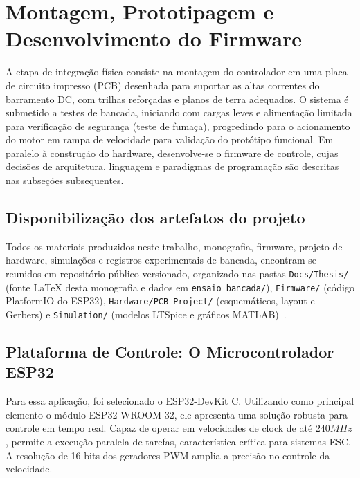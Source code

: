\section{Montagem, Prototipagem e Desenvolvimento do Firmware}
A etapa de integração física consiste na montagem do controlador em uma placa de circuito impresso (PCB) desenhada para suportar as altas correntes do barramento DC, com trilhas reforçadas e planos de terra adequados. O sistema é submetido a testes de bancada, iniciando com cargas leves e alimentação limitada para verificação de segurança (teste de fumaça), progredindo para o acionamento do motor em rampa de velocidade para validação do protótipo funcional. Em paralelo à construção do hardware, desenvolve-se o firmware de controle, cujas decisões de arquitetura, linguagem e paradigmas de programação são descritas nas subseções subsequentes.

\subsection{Disponibilização dos artefatos do projeto}
\label{subsec:repositorio_projeto}
Todos os materiais produzidos neste trabalho, monografia, firmware, projeto de hardware, simulações e registros experimentais de bancada, encontram-se reunidos em repositório público versionado, organizado nas pastas \texttt{Docs/Thesis/} (fonte \LaTeX{} desta monografia e dados em \texttt{ensaio\_bancada/}), \texttt{Firmware/} (código PlatformIO do ESP32), \texttt{Hardware/PCB\_Project/} (esquemáticos, layout e Gerbers) e \texttt{Simulation/} (modelos LTSpice e gráficos MATLAB)~\cite{esp32BldcEscRepo}.

\subsection{Plataforma de Controle: O Microcontrolador ESP32}
Para essa aplicação, foi selecionado o ESP32-DevKit C. Utilizando como principal elemento o módulo ESP32-WROOM-32, ele apresenta uma solução robusta para controle em tempo real. Capaz de operar em velocidades de clock de até $240 MHz$, permite a execução paralela de tarefas, característica crítica para sistemas ESC. A resolução de 16 bits dos geradores PWM amplia a precisão no controle da velocidade.


